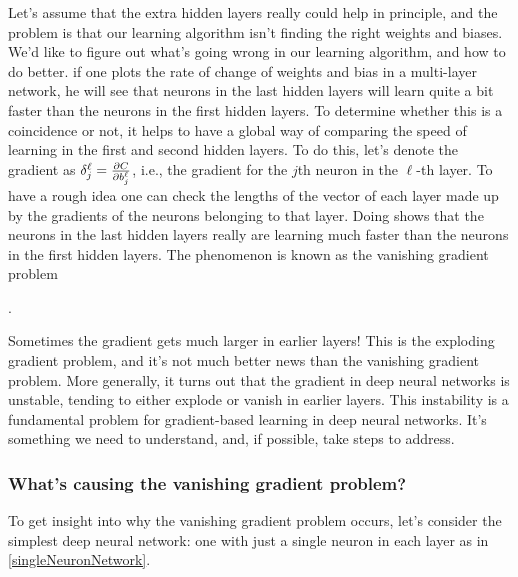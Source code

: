 Let's assume that the extra hidden layers really could help in principle, and the problem is that our learning algorithm isn't finding the right weights and biases. We'd like to figure out what's going wrong in our learning algorithm, and how to do better. if one plots the rate of change of weights and bias in a multi-layer network, he will see that neurons in the last hidden layers will learn quite a bit faster than the neurons in the first hidden layers.
To determine whether this is a coincidence or not, it helps to have a global way of comparing the speed of learning in the first and second hidden layers. To do this, let's denote the gradient as $\delta^\ell_j=\frac{\mathrm{\partial} C}{\mathrm{\partial} b^\ell_j}$, i.e., the gradient for the $j$th neuron in the $\ell$-th layer. To have a rough idea one can check the lengths of the vector of each layer made up by the gradients of the neurons belonging to that layer. Doing shows that the neurons in the last hidden layers really are learning much faster than the neurons in the first hidden layers. The phenomenon is known as the vanishing gradient problem {. 

Sometimes the gradient gets much larger in earlier layers! This is the exploding gradient problem, and it's not much better news than the vanishing gradient problem. More generally, it turns out that the gradient in deep neural networks is unstable, tending to either explode or vanish in earlier layers. This instability is a fundamental problem for gradient-based learning in deep neural networks. It's something we need to understand, and, if possible, take steps to address.

\subsubsection{What's causing the vanishing gradient problem?}
To get insight into why the vanishing gradient problem occurs, let's consider the simplest deep neural network: one with just a single neuron in each layer as in \autoref{singleNeuronNetwork}.

}
